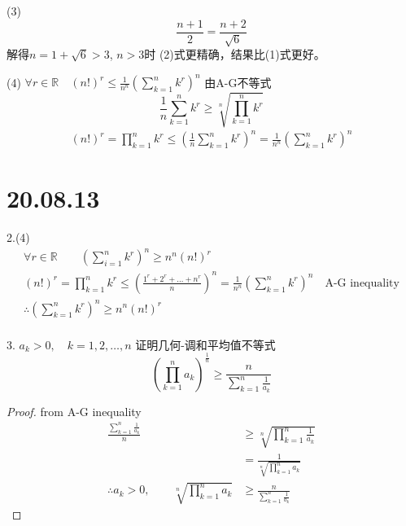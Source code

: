 \documentclass[10pt,a4paper]{book}
\begin{document}
	(3) 
	\begin{equation}
		\frac{n+1}{2} = \frac{n+2}{\sqrt{6}}
	\end{equation}
	解得$ n=1+\sqrt{6} >3 $, 
	$ n>3 $时 (2)式更精确，结果比(1)式更好。
	
	(4) $ \forall r \in \mathbb{R} \quad (n!)^r \le \frac{1}{n^n}(\sum_{k=1}^n k^r)^n$
	由A-G不等式
	\begin{equation}
		\frac{1}{n}\sum_{k=1}^n k^r \ge \sqrt[n]{\prod_{k=1}^n k^r}
	\end{equation}
	\begin{equation}
		\begin{aligned}
			(n!)^r  = \prod_{k=1}^n k^r\le (\frac{1}{n}\sum_{k=1}^n k^r)^n =\frac{1}{n^n}(\sum_{k=1}^n k^r)^n
		\end{aligned}
	\end{equation}
	
	\section{20.08.13}
	2.(4) 
	\begin{equation}
		\begin{aligned}
			\forall r \in \mathbb{R} \qquad (\sum_{i=1}^n k^r)^n \ge n^n(n!)^r \\
			 (n!)^r = \prod_{k=1}^n k^r \le (\frac{1^r+2^r+\dots + n^r}{n})^n = \frac{1}{n^n}(\sum_{k=1}^n k^r)^n \quad \text{A-G inequality} \\
			 \therefore (\sum_{k=1}^n k^r)^n \ge n^n(n!)^r\\
		\end{aligned}
	\end{equation}
	
	3. $ a_k >0, \quad k=1,2,\dots, n $ 证明几何-调和平均值不等式
	\begin{equation}
		(\prod_{k=1}^n a_k)^{\frac{1}{n}}\ge \frac{n}{\sum_{k=1}^n\frac{1}{a_k}}
	\end{equation}	
	\begin{proof}
		from A-G inequality 
		\begin{equation}
			\begin{aligned}
				\frac{\sum_{k=1}^n\frac{1}{a_k}}{n} &\ge \sqrt[n]{\prod_{k=1}^n \frac{1}{a_k}} \\
				& =  \frac{1}{\sqrt[n]{\prod_{k=1}^n{a_k}}}\\
				\therefore a_k>0, \qquad {\sqrt[n]{\prod_{k=1}^n{a_k}}}&\ge \frac{n}{\sum_{k=1}^n\frac{1}{a_k}}
			\end{aligned}
		\end{equation}
		
	\end{proof}
	
\end{document}
